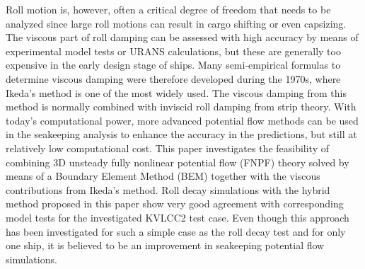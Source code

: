 \label{abstract}

Roll motion is, however, often a critical degree of freedom that needs to be analyzed since large roll motions can result in cargo shifting or even capsizing. The viscous part of roll damping can be assessed with high accuracy by means of experimental model tests or URANS calculations, but these are generally too expensive in the early design stage of ships. Many semi-empirical formulas to
determine viscous damping were therefore developed during the 1970s, where Ikeda's method is one of the most widely used. The viscous damping from this method is normally combined with inviscid roll damping from strip theory. With today's computational power, more advanced potential flow methods can be used in the seakeeping analysis to enhance the accuracy in the predictions, but still at relatively low computational cost. This paper investigates the feasibility of combining 3D unsteady fully nonlinear potential flow (FNPF) theory solved by means of a Boundary Element Method (BEM) together with the viscous contributions from Ikeda's method. Roll decay simulations with the hybrid method proposed in this paper show very good agreement with corresponding model tests for the investigated KVLCC2 test case. Even though this approach has been investigated for such a simple case as the roll decay test and for only one ship, it is believed to be an improvement in seakeeping
potential flow simulations.

    